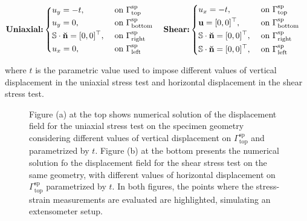 {\small
\begin{equation}\label{eq:bcs_elasticity_synth_data}
	\textbf{Uniaxial:} \begin{cases}
		\begin{aligned}
			&u_{y} =-t,~&&\text{on}~\Gamma_{\text{top}}^{\text{sp}}	\\
			&u_{y} = 0,~&&\text{on}~\Gamma_{\text{bottom}}^{\text{sp}} \\
			&\mathbb{S} \cdot \mathbf{\breve{n}} = [0,0]^{\top},~&&\text{on}~\Gamma_{\text{right}}^{\text{sp}} \\
			&u_{x} = 0,~&&\text{on}~\Gamma_{\text{left}}^{\text{sp}} \\
		\end{aligned}
	\end{cases} 
	\textbf{Shear:} \begin{cases}
		\begin{aligned}
			&u_{x} =-t,~&&\text{on}~\Gamma_{\text{top}}^{\text{sp}}	\\
			&\mathbf{u} = [0,0]^{\top},~&&\text{on}~\Gamma_{\text{bottom}}^{\text{sp}} \\
			&\mathbb{S} \cdot \mathbf{\breve{n}} = [0,0]^{\top},~&&\text{on}~\Gamma_{\text{right}}^{\text{sp}}\\
			&\mathbb{S} \cdot \mathbf{\breve{n}} = [0,0]^{\top},~&&\text{on}~\Gamma_{\text{left}}^{\text{sp}}
		\end{aligned}
	\end{cases} 
\end{equation}
}

where $ t $ is the parametric value used to impose different values of vertical displacement in the uniaxial stress test and horizontal displacement in the shear stress test. 


\begin{figure}[h!]
	\centering
	\caption{Figure (a) at the top shows numerical solution of the displacement field for the uniaxial stress test on the specimen geometry considering different values of vertical displacement on $\Gamma_{\text{top}}^{\text{sp}}$ and parametrized by $t$. Figure (b) at the bottom presents the numerical solution fo the displacement field for the shear stress test on the same geometry, with different values of horizontal displacement on $\Gamma_{\text{top}}^{\text{sp}}$ parametrized by $t$. In both figures, the points where the stress-strain measurements are evaluated are highlighted, simulating an extensometer setup. }
	\def\svgwidth{\columnwidth}  
	  
	\label{fig:synthetic_data_elastostatic}  
\end{figure}

